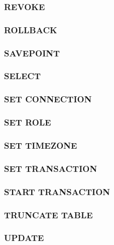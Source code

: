 \documentclass[10pt,twocolumn,fleqn]{article}
\begin{document}
\subsubsection*{REVOKE}
\subsubsection*{ROLLBACK }
\subsubsection*{SAVEPOINT}
\subsubsection*{SELECT }
\subsubsection*{SET CONNECTION}
\subsubsection*{SET ROLE }
\subsubsection*{SET TIMEZONE }
\subsubsection*{SET TRANSACTION}
\subsubsection*{START TRANSACTION}
\subsubsection*{TRUNCATE TABLE}
\subsubsection*{UPDATE}
\end{document}
